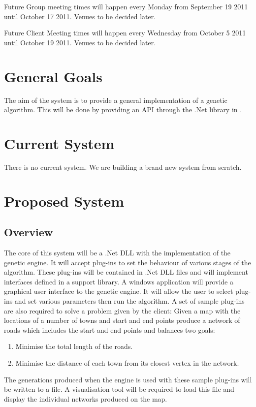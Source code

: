 Future Group meeting times will happen every Monday from September 19 2011 until October 17 2011. Venues to be decided later.

Future Client Meeting times will happen every Wednesday from October 5 2011 until October 19 2011. Venues to be decided later. 

\clearpage

\tableofcontents

\clearpage


%
%
\section{General Goals}
The aim of the system is to provide a general implementation of a genetic algorithm. 
This will be done by providing an API through the .Net library in \csharp. 


%
%
\section{Current System}
There is no current system. We are building a brand new system from scratch.


%
%

\section{Proposed System}
\subsection{Overview}
The core of this system will be a .Net DLL with the implementation of the genetic engine. It will accept plug-ins to set the behaviour of various stages of the algorithm. These plug-ins will be contained in .Net DLL files and will implement interfaces defined in a support library.
A windows application will provide a graphical user interface to the genetic engine. It will allow the user to select plug-ins and set various parameters then run the algorithm.
A set of sample plug-ins are also required to solve a problem given by the client: Given a map with the locations of a number of towns and start and end points produce a network of roads which includes the start and end points and balances two goals:
\begin{enumerate}
\item Minimise the total length of the roads.
\item Minimise the distance of each town from its closest vertex in the network.
\end{enumerate}
The generations produced when the engine is used with these sample plug-ins will be written to a file. A visualisation tool will be required to load this file and display the individual networks produced on the map.

